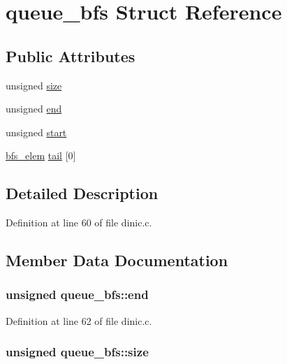 \hypertarget{structqueue__bfs}{
\section{queue\_\-bfs Struct Reference}
\label{structqueue__bfs}
}
\subsection*{Public Attributes}
\begin{DoxyCompactItemize}
\item 
unsigned \hyperlink{structqueue__bfs_abf753233a95876d3a2f7c3ff4279abd8}{size}
\item 
unsigned \hyperlink{structqueue__bfs_ac5ecf1992905bc9872ff93943105d3b2}{end}
\item 
unsigned \hyperlink{structqueue__bfs_a39ce7143813704c9c3a4b62c85f51cc9}{start}
\item 
\hyperlink{structbfs__elem}{bfs\_\-elem} \hyperlink{structqueue__bfs_a0c790ded4b0bdb16f4e547e1be66776c}{tail} \mbox{[}0\mbox{]}
\end{DoxyCompactItemize}


\subsection{Detailed Description}


Definition at line 60 of file dinic.c.



\subsection{Member Data Documentation}
\hypertarget{structqueue__bfs_ac5ecf1992905bc9872ff93943105d3b2}{
\subsubsection[{end}]{\setlength{\rightskip}{0pt plus 5cm}unsigned {\bf queue\_\-bfs::end}}}
\label{structqueue__bfs_ac5ecf1992905bc9872ff93943105d3b2}


Definition at line 62 of file dinic.c.

\hypertarget{structqueue__bfs_abf753233a95876d3a2f7c3ff4279abd8}{
\subsubsection[{size}]{\setlength{\rightskip}{0pt plus 5cm}unsigned {\bf queue\_\-bfs::size}}}
\label{structqueue__bfs_abf753233a95876d3a2f7c3ff4279abd8}


